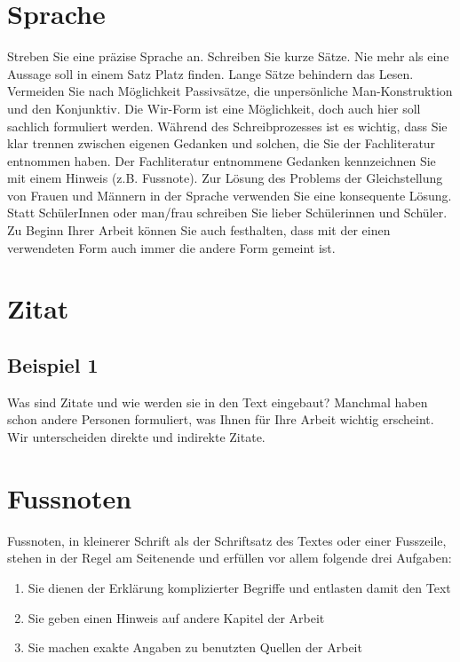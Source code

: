 \section{Sprache}
Streben Sie eine präzise Sprache an. Schreiben Sie kurze Sätze. Nie mehr als eine Aussage soll in einem Satz Platz finden. Lange Sätze behindern das Lesen. Vermeiden Sie nach Möglichkeit Passivsätze, die unpersönliche Man-Konstruktion und den Konjunktiv. Die Wir-Form ist eine Möglichkeit, doch auch hier soll sachlich formuliert werden. Während des Schreibprozesses ist es wichtig, dass Sie klar trennen zwischen eigenen Gedanken und solchen, die Sie der Fachliteratur entnommen haben. Der Fachliteratur entnommene Gedanken kennzeichnen Sie mit einem Hinweis (z.B. Fussnote).
Zur Lösung des Problems der Gleichstellung von Frauen und Männern in der Sprache verwenden Sie eine konsequente Lösung. Statt SchülerInnen oder man/frau schreiben Sie lieber Schülerinnen und Schüler. Zu Beginn Ihrer Arbeit können Sie auch festhalten, dass mit der einen verwendeten Form auch immer die andere Form gemeint ist.

\section{Zitat}

\subsection{Beispiel 1}

Was sind Zitate und wie werden sie in den Text eingebaut? Manchmal haben schon andere Personen formuliert, was Ihnen für Ihre Arbeit wichtig erscheint. Wir unterscheiden direkte und indirekte Zitate. 

\section{Fussnoten}

Fussnoten, in kleinerer Schrift als der Schriftsatz des Textes oder einer Fusszeile, stehen in der Regel am Seitenende und erfüllen vor allem folgende drei Aufgaben:


\begin{enumerate}
\item Sie dienen der Erklärung komplizierter Begriffe und entlasten damit den Text 
\item Sie geben einen Hinweis auf andere Kapitel der Arbeit 
\item Sie machen exakte Angaben zu benutzten Quellen der Arbeit
\end{enumerate}

